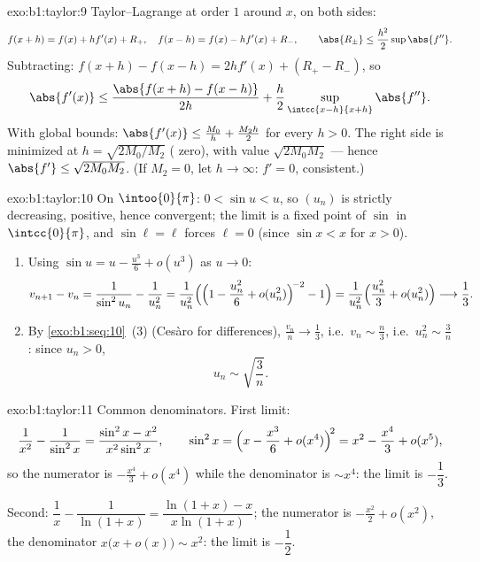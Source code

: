 \begin{solution}{exo:b1:taylor:9}
Taylor--Lagrange at order $1$ around $x$, on both sides:
\[
f(x + h) = f(x) + h f'(x) + R_+,\quad
f(x - h) = f(x) - h f'(x) + R_-,
\qquad \abs{R_\pm} \leq \frac{h^2}{2} \sup \abs{f''} .
\]
Subtracting: $f(x+h) - f(x-h) = 2h f'(x) + (R_+ - R_-)$, so
\[
\abs{f'(x)} \leq \frac{\abs{f(x+h) - f(x-h)}}{2h} +
\frac{h}{2}\sup_{\intcc{x-h}{x+h}}\abs{f''} .
\]
With global bounds: $\abs{f'(x)} \leq \frac{M_0}{h} + \frac{M_2
h}{2}$ for every $h > 0$. The right side is minimized at $h =
\sqrt{2M_0/M_2}$ ( zero), with value $\sqrt{2M_0M_2}$
--- hence $\abs{f'} \leq \sqrt{2M_0M_2}$. (If $M_2 = 0$, let $h \to
\infty$: $f' = 0$, consistent.)
\end{solution}

\begin{solution}{exo:b1:taylor:10}
On $\intoo{0}{\pi}$: $0 < \sin u < u$, so $(u_n)$ is strictly
decreasing, positive, hence convergent; the limit is a fixed point
of $\sin$ in $\intcc{0}{\pi}$, and $\sin \ell = \ell$ forces $\ell =
0$ (since $\sin x < x$ for $x > 0$).
\begin{enumerate}
  \item Using $\sin u = u - \frac{u^3}{6} + o(u^3)$ as $u \to 0$:
        \[
        v_{n+1} - v_n = \frac{1}{\sin^2 u_n} - \frac{1}{u_n^2}
        = \frac{1}{u_n^2}\Bigl(\Bigl(1 - \frac{u_n^2}{6} +
        o(u_n^2)\Bigr)^{\!-2} - 1\Bigr)
        = \frac{1}{u_n^2}\Bigl(\frac{u_n^2}{3} + o(u_n^2)\Bigr)
        \longrightarrow \frac13 .
        \]
  \item By \cref{exo:b1:seq:10}~(3) (Ces\`aro for differences),
        $\frac{v_n}{n} \to \frac13$, i.e.\ $v_n \sim \frac n3$, i.e.\
        $u_n^2 \sim \frac 3n$: since $u_n > 0$,
        \[
        u_n \sim \sqrt{\frac{3}{n}} .
        \]
\end{enumerate}
\end{solution}

\begin{solution}{exo:b1:taylor:11}
Common denominators. First limit:
\[
\frac{1}{x^2} - \frac{1}{\sin^2 x}
= \frac{\sin^2 x - x^2}{x^2\sin^2 x},
\qquad
\sin^2 x = \Bigl(x - \frac{x^3}{6} + o(x^4)\Bigr)^{\!2}
= x^2 - \frac{x^4}{3} + o(x^5) ,
\]
so the numerator is $-\frac{x^4}{3} + o(x^4)$ while the
denominator is $\sim x^4$: the limit is $-\dfrac13$.

Second: $\dfrac1x - \dfrac{1}{\ln(1+x)} = \dfrac{\ln(1+x) -
x}{x\ln(1+x)}$; the numerator is $-\frac{x^2}{2} + o(x^2)$, the
denominator $x\bigl(x + o(x)\bigr) \sim x^2$: the limit is
$-\dfrac12$.
\end{solution}


